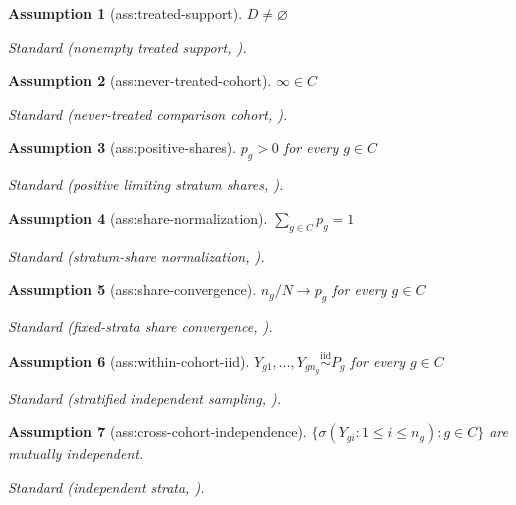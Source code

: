 \documentclass{article}
\newtheorem{assumption}{Assumption}
\begin{document}
\begin{assumption}[ass:treated-support]\label{ass:treated-support}
\(D\ne\varnothing\)
\par\smallskip\noindent\emph{Standard} (nonempty treated support, \cite{MoreauKastler2025}).
\end{assumption}

\begin{assumption}[ass:never-treated-cohort]\label{ass:never-treated-cohort}
\(\infty\in C\)
\par\smallskip\noindent\emph{Standard} (never-treated comparison cohort, \cite{MoreauKastler2025}).
\end{assumption}

\begin{assumption}[ass:positive-shares]\label{ass:positive-shares}
\(p_g>0\) for every \(g\in C\)
\par\smallskip\noindent\emph{Standard} (positive limiting stratum shares, \cite{RothSantAnna2023}).
\end{assumption}

\begin{assumption}[ass:share-normalization]\label{ass:share-normalization}
\(\sum_{g\in C}p_g=1\)
\par\smallskip\noindent\emph{Standard} (stratum-share normalization, \cite{RothSantAnna2023}).
\end{assumption}

\begin{assumption}[ass:share-convergence]\label{ass:share-convergence}
\(n_g/N\to p_g\) for every \(g\in C\)
\par\smallskip\noindent\emph{Standard} (fixed-strata share convergence, \cite{RothSantAnna2023}).
\end{assumption}

\begin{assumption}[ass:within-cohort-iid]\label{ass:within-cohort-iid}
\(Y_{g1},\ldots,Y_{g n_g}\overset{\mathrm{iid}}{\sim}P_g\) for every \(g\in C\)
\par\smallskip\noindent\emph{Standard} (stratified independent sampling, \cite{Newey1990}).
\end{assumption}

\begin{assumption}[ass:cross-cohort-independence]\label{ass:cross-cohort-independence}
\(\bigl\{\sigma(Y_{gi}:1\le i\le n_g):g\in C\bigr\}\) are mutually independent.
\par\smallskip\noindent\emph{Standard} (independent strata, \cite{Newey1990}).
\end{assumption}
\end{document}
